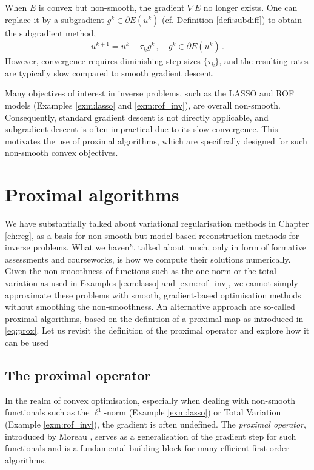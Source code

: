 When $E$ is convex but non-smooth, the gradient $\nabla E$ no longer exists. One can replace it by a subgradient $g^k \in \partial E(u^k)$ (cf. Definition \ref{defi:subdiff}) to obtain the subgradient method,
\begin{align}
u^{k+1} = u^k - \tau_k g^k \, , \quad g^k \in \partial E(u^k) \, .
\end{align}
However, convergence requires diminishing step sizes $\{\tau_k\}$, and the resulting rates are typically slow compared to smooth gradient descent.

Many objectives of interest in inverse problems, such as the LASSO and ROF models (Examples \ref{exm:lasso} and \ref{exm:rof_inv}), are overall non-smooth. Consequently, standard gradient descent is not directly applicable, and subgradient descent is often impractical due to its slow convergence. This motivates the use of proximal algorithms, which are specifically designed for such non-smooth convex objectives.

\section{Proximal algorithms}
We have substantially talked about variational regularisation methods in Chapter \ref{ch:reg}, as a basis for non-smooth but model-based reconstruction methods for inverse problems. What we haven't talked about much, only in form of formative assessments and courseworks, is how we compute their solutions numerically. Given the non-smoothness of functions such as the one-norm or the total variation as used in Examples \ref{exm:lasso} and \ref{exm:rof_inv}, we cannot simply approximate these problems with smooth, gradient-based optimisation methods without smoothing the non-smoothness. An alternative approach are so-called proximal algorithms, based on the definition of a proximal map as introduced in \eqref{eq:prox}. Let us revisit the definition of the proximal operator and explore how it can be used 

\subsection{The proximal operator}

In the realm of convex optimisation, especially when dealing with non-smooth functionals such as the $\ell^1$-norm (Example \ref{exm:lasso}) or Total Variation (Example \ref{exm:rof_inv}), the gradient is often undefined. The \emph{proximal operator}, introduced by Moreau \cite{moreau1965proximite}, serves as a generalisation of the gradient step for such functionals and is a fundamental building block for many efficient first-order algorithms.

